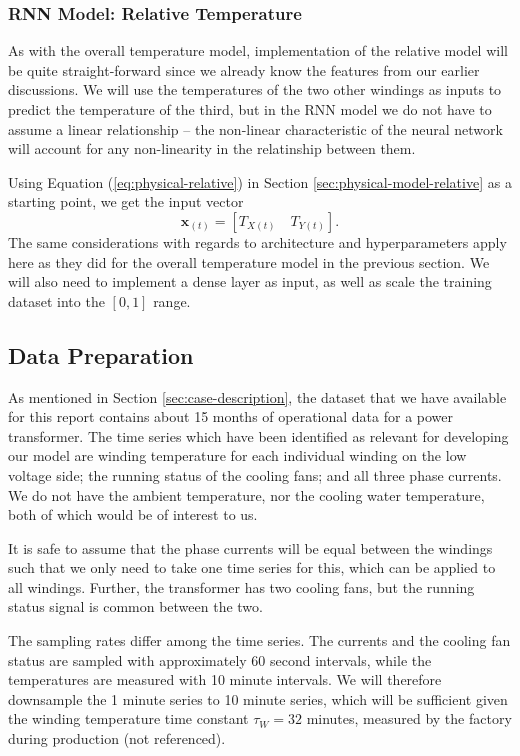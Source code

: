 \documentclass[]{article}
\begin{document}
\subsubsection{RNN Model: Relative Temperature} \label{sec:rnn-model-relative}
As with the overall temperature model, implementation of the relative model will be quite straight-forward since we already know the features from our earlier discussions. We will use the temperatures of the two other windings as inputs to predict the temperature of the third, but in the RNN model we do not have to assume a linear relationship -- the non-linear characteristic of the neural network will account for any non-linearity in the relatinship between them. 

Using Equation (\ref{eq:physical-relative}) in Section \ref{sec:physical-model-relative} as a starting point, we get the input vector 
\begin{equation}
	\mathbf{x}_{(t)} = [T_{X(t)} \quad T_{Y(t)}].
\end{equation}
The same considerations with regards to architecture and hyperparameters apply here as they did for the overall temperature model in the previous section. We will also need to implement a dense layer as input, as well as scale the training dataset into the $[0,1]$ range.

\subsection{Data Preparation} \label{sec:data-prep}
As mentioned in Section \ref{sec:case-description}, the dataset that we have available for this report contains about 15 months of operational data for a power transformer. The time series which have been identified as relevant for developing our model are winding temperature for each individual winding on the low voltage side; the running status of the cooling fans; and all three phase currents. We do not have the ambient temperature, nor the cooling water temperature, both of which would be of interest to us.

It is safe to assume that the phase currents will be equal between the windings such that we only need to take one time series for this, which can be applied to all windings. Further, the transformer has two cooling fans, but the running status signal is common between the two.

The sampling rates differ among the time series. The currents and the cooling fan status are sampled with approximately 60 second intervals, while the temperatures are measured with 10 minute intervals. We will therefore downsample the 1 minute series to 10 minute series, which will be sufficient given the winding temperature time constant $\tau_W = 32$ minutes, measured by the factory during production (not referenced).
\end{document}
